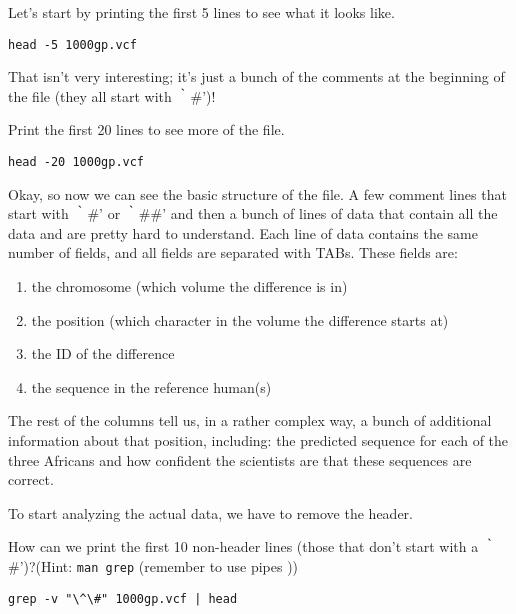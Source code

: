 \begin{steps}
Let's start by printing the first 5 lines to see what it looks like.
\begin{lstlisting}
head -5 1000gp.vcf
\end{lstlisting}
\end{steps}

\begin{note}
That isn't very interesting; it's just a bunch of the comments at the beginning of the file (they all start with ｀\#')! 
\end{note}

\begin{steps}
Print the first 20 lines to see more of the file.
\begin{lstlisting}
head -20 1000gp.vcf
\end{lstlisting}
\end{steps}

\begin{note}
Okay, so now we can see the basic structure of the file. A few comment lines that start with ｀\#' or ｀\#\#' and then a bunch of lines of data that contain all the data and are pretty hard to understand. Each line of data contains the same number of fields, and all fields are separated with TABs. These fields are:
\begin{enumerate}[style=multiline,labelindent=0cm,align=left,leftmargin=0.5cm]
\item the chromosome (which volume the difference is in)
\item the position (which character in the volume the difference starts at)
\item the ID of the difference
\item the sequence in the reference human(s)
\end{enumerate}
The rest of the columns tell us, in a rather complex way, a bunch of additional information about that position, including: the predicted sequence for each of the three Africans and how confident the scientists are that these sequences are correct.

To start analyzing the actual data, we have to remove the header.
\end{note}

\begin{questions}
How can we print the first 10 non-header lines (those that don't start with a ｀\#')?(Hint: \texttt{man grep} (remember to use pipes \texttt{\textbar}))
\begin{answer}
\begin{lstlisting}
grep -v "\^\#" 1000gp.vcf | head  
\end{lstlisting}
\end{answer}
\end{questions}

